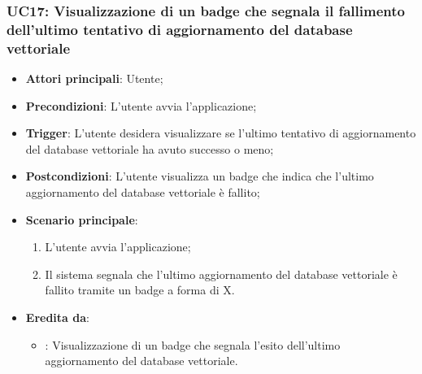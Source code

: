 \subsubsection{UC17: Visualizzazione di un badge che segnala il fallimento dell'ultimo tentativo di aggiornamento del database vettoriale}
\begin{itemize}
    \item \textbf{Attori principali}: Utente;
    \item \textbf{Precondizioni}: L'utente avvia l'applicazione;
    \item \textbf{Trigger}: L'utente desidera visualizzare se l'ultimo tentativo di aggiornamento del database vettoriale
    ha avuto successo o meno;
    \item \textbf{Postcondizioni}: L'utente visualizza un badge che indica che l'ultimo aggiornamento del database vettoriale
    è fallito;
    \item \textbf{Scenario principale}:
    \begin{enumerate}
        \item L'utente avvia l'applicazione;
        \item Il sistema segnala che l'ultimo aggiornamento del database vettoriale è fallito tramite un badge a forma di X.
    \end{enumerate}
    \item \textbf{Eredita da}:
    \begin{itemize}
        \item {}: Visualizzazione di un badge che segnala l'esito dell'ultimo aggiornamento del database vettoriale.
    \end{itemize}
\end{itemize}

\hypertarget{UC20}{}
